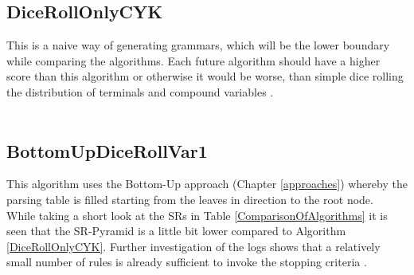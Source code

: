 \pagebreak
\subsection{DiceRollOnlyCYK}
\noindent This is a naive way of generating grammars, which will be the lower boundary while comparing the algorithms. Each future algorithm should have a higher score than this algorithm or otherwise it would be worse, than simple dice rolling the distribution of terminals  and compound variables . \\

\noindent
{}\\
\pagebreak


\subsection{BottomUpDiceRollVar1}
This algorithm uses the Bottom-Up approach (Chapter \ref{approaches}) whereby the parsing table is filled starting from the leaves in direction to the root node.\\

\noindent
{}
\noindent While taking a short look at the SRs in Table \ref{ComparisonOfAlgorithms} it is seen that the SR-Pyramid is a little bit lower compared to Algorithm \ref{DiceRollOnlyCYK}. Further investigation of the logs shows that a relatively small number of rules is already sufficient to invoke the stopping criteria . 

